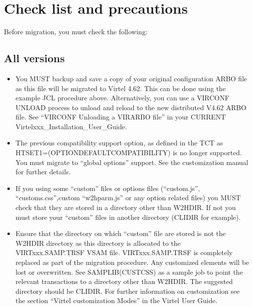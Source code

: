 \documentclass[letterpaper,10pt,english]{sphinxmanual}
\begin{document}
\ignorespaces 

\chapter{Check list and precautions}
\label{\detokenize{Migration_Guide:check-list-and-precautions}}\label{\detokenize{Migration_Guide:index-2}}
\sphinxAtStartPar
Before migration, you must check the following:\sphinxhyphen{}


\section{All versions}
\label{\detokenize{Migration_Guide:all-versions}}\begin{itemize}
\item {} 
\sphinxAtStartPar
You MUST backup and save a copy of your original configuration ARBO file as this file will be migrated to Virtel 4.62. This can be done using the example JCL procedure above. Alternatively, you can use a VIRCONF UNLOAD process to unload and reload to the new distributed V4.62 ARBO file. See “VIRCONF \sphinxhyphen{} Unloading a VIRARBO file” in your CURRENT Virtelxxx\_Installation\_User\_Guide.

\item {} 
\sphinxAtStartPar
The previous compatibility support option, as defined in the TCT as HTSET1=(OPTION\sphinxhyphen{}DEFAULT\sphinxhyphen{}COMPATIBILITY) is no longer supported. You must migrate to “global options” support. See the customization manual for further details.

\item {} 
\sphinxAtStartPar
If you using some “custom” files or options files (“custom.js”, “customs.css”,custom “w2hparm.js” or any option related files) you MUST check that they are stored in a directory other than W2H\sphinxhyphen{}DIR. If not you must store your “custom” files in another directory (CLI\sphinxhyphen{}DIR for example).

\item {} 
\sphinxAtStartPar
Ensure that the directory on which “custom” file are stored is not the W2H\sphinxhyphen{}DIR directory as this directory is allocated to the VIRTxxx.SAMP.TRSF VSAM file. VIRTxxx.SAMP.TRSF is completely replaced as part of the migration procedure. Any customized elements will be lost or overwritten. See SAMPLIB(CUSTCSS) as a sample job to point the relevant transactions to a directory other than W2H\sphinxhyphen{}DIR. The suggested directory should be CLI\sphinxhyphen{}DIR. For further information on customization see the section “Virtel customization Modes” in the Virtel User Guide.

\end{itemize}
\end{document}

